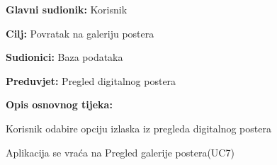 					\noindent {}
					\begin{packed_item}
						
						\item \textbf{Glavni sudionik: }Korisnik
						\item  \textbf{Cilj:} Povratak na galeriju postera
						\item  \textbf{Sudionici:} Baza podataka
						\item  \textbf{Preduvjet:} Pregled digitalnog postera
						\item  \textbf{Opis osnovnog tijeka:}
						
						\item[] \begin{packed_enum}
							
							\item Korisnik odabire opciju izlaska iz pregleda digitalnog postera
							\item Aplikacija se vraća na Pregled galerije postera(UC7)
							
						\end{packed_enum}
					\end{packed_item}
					
